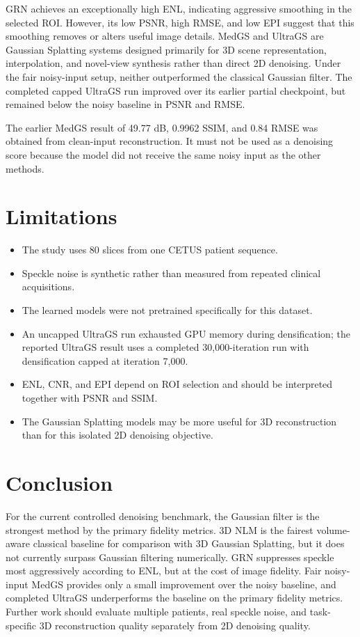 \documentclass[11pt,a4paper]{article}
\begin{document}
GRN achieves an exceptionally high ENL, indicating aggressive smoothing in the selected ROI. However, its low PSNR, high RMSE, and low EPI suggest that this smoothing removes or alters useful image details. MedGS and UltraGS are Gaussian Splatting systems designed primarily for 3D scene representation, interpolation, and novel-view synthesis rather than direct 2D denoising. Under the fair noisy-input setup, neither outperformed the classical Gaussian filter. The completed capped UltraGS run improved over its earlier partial checkpoint, but remained below the noisy baseline in PSNR and RMSE.

The earlier MedGS result of 49.77 dB, 0.9962 SSIM, and 0.84 RMSE was obtained from clean-input reconstruction. It must not be used as a denoising score because the model did not receive the same noisy input as the other methods.

\section{Limitations}
\begin{itemize}
    \item The study uses 80 slices from one CETUS patient sequence.
    \item Speckle noise is synthetic rather than measured from repeated clinical acquisitions.
    \item The learned models were not pretrained specifically for this dataset.
    \item An uncapped UltraGS run exhausted GPU memory during densification; the reported UltraGS result uses a completed 30,000-iteration run with densification capped at iteration 7,000.
    \item ENL, CNR, and EPI depend on ROI selection and should be interpreted together with PSNR and SSIM.
    \item The Gaussian Splatting models may be more useful for 3D reconstruction than for this isolated 2D denoising objective.
\end{itemize}

\section{Conclusion}
For the current controlled denoising benchmark, the Gaussian filter is the strongest method by the primary fidelity metrics. 3D NLM is the fairest volume-aware classical baseline for comparison with 3D Gaussian Splatting, but it does not currently surpass Gaussian filtering numerically. GRN suppresses speckle most aggressively according to ENL, but at the cost of image fidelity. Fair noisy-input MedGS provides only a small improvement over the noisy baseline, and completed UltraGS underperforms the baseline on the primary fidelity metrics. Further work should evaluate multiple patients, real speckle noise, and task-specific 3D reconstruction quality separately from 2D denoising quality.
\end{document}
